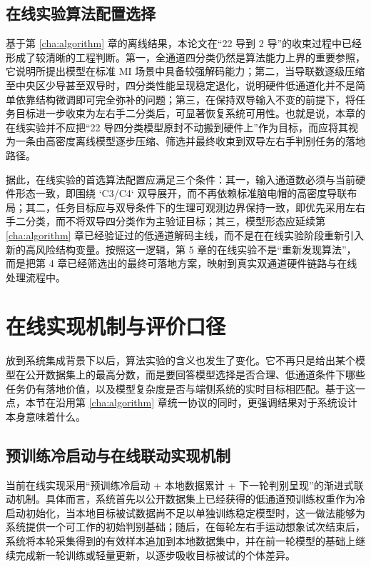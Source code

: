 \subsection{在线实验算法配置选择}

基于第 \ref{cha:algorithm} 章的离线结果，本论文在“22 导到 2 导”的收束过程中已经形成了较清晰的工程判断。第一，全通道四分类仍然是算法能力上界的重要参照，它说明所提出模型在标准 MI 场景中具备较强解码能力；第二，当导联数逐级压缩至中央区少导甚至双导时，四分类性能呈现稳定退化，说明硬件低通道化并不是简单依靠结构微调即可完全弥补的问题；第三，在保持双导输入不变的前提下，将任务目标进一步收束为左右手二分类后，可显著恢复系统可用性。也就是说，本章的在线实验并不应把“22 导四分类模型原封不动搬到硬件上”作为目标，而应将其视为一条由高密度离线模型逐步压缩、筛选并最终收束到双导左右手判别任务的落地路径。

据此，在线实验的首选算法配置应满足三个条件：其一，输入通道数必须与当前硬件形态一致，即围绕 `C3/C4` 双导展开，而不再依赖标准脑电帽的高密度导联布局；其二，任务目标应与双导条件下的生理可观测边界保持一致，即优先采用左右手二分类，而不将双导四分类作为主验证目标；其三，模型形态应延续第 \ref{cha:algorithm} 章已经验证过的低通道解码主线，而不是在在线实验阶段重新引入新的高风险结构变量。按照这一逻辑，第 5 章的在线实验不是“重新发现算法”，而是把第 4 章已经筛选出的最终可落地方案，映射到真实双通道硬件链路与在线处理流程中。

\section{在线实现机制与评价口径}

放到系统集成背景下以后，算法实验的含义也发生了变化。它不再只是给出某个模型在公开数据集上的最高分数，而是要回答模型选择是否合理、低通道条件下哪些任务仍有落地价值，以及模型复杂度是否与端侧系统的实时目标相匹配。基于这一点，本节在沿用第 \ref{cha:algorithm} 章统一协议的同时，更强调结果对于系统设计本身意味着什么。

\subsection{预训练冷启动与在线联动实现机制}

当前在线实现采用“预训练冷启动 + 本地数据累计 + 下一轮判别呈现”的渐进式联动机制。具体而言，系统首先以公开数据集上已经获得的低通道预训练权重作为冷启动初始化，当本地目标被试数据尚不足以单独训练稳定模型时，这一做法能够为系统提供一个可工作的初始判别基础；随后，在每轮左右手运动想象试次结束后，系统将本轮采集得到的有效样本追加到本地数据集中，并在前一轮模型的基础上继续完成新一轮训练或轻量更新，以逐步吸收目标被试的个体差异。

